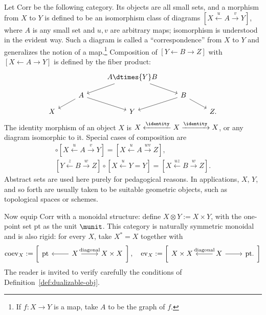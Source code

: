 \begin{example}[Correspondences]
	Let $\mathrm{Corr}$ be the following category. Its objects are all small
	sets, and a morphism from $X$ to $Y$ is defined to be an isomorphism class
	of diagrams $[X\xleftarrow{u}A\xrightarrow{v}Y]$, where $A$ is any small
	set and $u,v$ are arbitrary maps; isomorphism is understood in the evident
	way. Such a diagram is called a ``correspondence'' from $X$ to $Y$ and
	generalizes the notion of a map.\footnote{If $f:X\to Y$ is a map, take $A$
	to be the graph of $f$.} Composition of $[Y\leftarrow B\rightarrow Z]$
	with $[X\leftarrow A\rightarrow Y]$ is defined by the fiber product:
	\[\begin{tikzcd}[row sep=small]
		& & A \dtimes{Y} B \arrow[ld] \arrow[rd] & & \\
		& A \arrow[ld] \arrow[rd] & & B \arrow[ld] \arrow[rd] & \\
		X & & Y & & Z.
	\end{tikzcd}\]
	The identity morphism of an object $X$ is
	$X\xleftarrow{\identity}X\xrightarrow{\identity}X$, or any diagram
	isomorphic to it. Special cases of composition are
	\begin{gather*}
		[Y = Y \xrightarrow{w} Z] \circ [X \xleftarrow{u} A \xrightarrow{v} Y] = [X \xleftarrow{u} A \xrightarrow{wv} Z ], \\
		[Y \xleftarrow{z} B \xrightarrow{w} Z] \circ [X \xleftarrow{u} Y = Y] = [X \xleftarrow{uz} B \xrightarrow{w} Z].
	\end{gather*}
	Abstract sets are used here purely for pedagogical reasons. In applications,
	$X$, $Y$, and so forth are usually taken to be suitable geometric objects,
	such as topological spaces or schemes.

	Now equip $\mathrm{Corr}$ with a monoidal structure: define
	$X\otimes Y:=X\times Y$, with the one-point set $\mathrm{pt}$ as the unit
	$\munit$. This category is naturally symmetric monoidal and is also rigid:
	for every $X$, take $X^*=X$ together with
	\[ \mathrm{coev}_X := \left[\begin{tikzcd}[row sep=tiny]
		\mathrm{pt} & X \arrow[l] \arrow[r, "\text{diagonal}"] & X \times X
	\end{tikzcd}\right], \quad
	\mathrm{ev}_X := \left[\begin{tikzcd}[row sep=tiny]
		X \times X & X \arrow[r] \arrow[l, "\text{diagonal}"'] & \mathrm{pt}.
	\end{tikzcd}\right] \]
	The reader is invited to verify carefully the conditions of
	Definition~\ref{def:dualizable-obj}.


\end{example}
